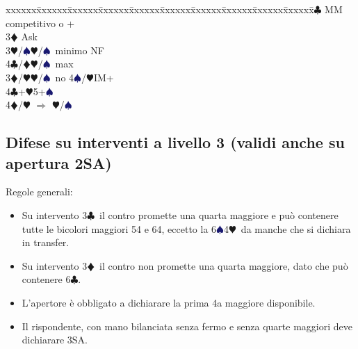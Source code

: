 \documentclass[a4paper,italian]{article}
\newcommand{\BC}{\textcolor{OliveGreen}{$\clubsuit$}}
\newcommand{\BD}{\textcolor{RedOrange}{$\vardiamondsuit$}}
\newcommand{\BH}{\textcolor{Red2}{$\varheartsuit${}}}
\newcommand{\BS}{\textcolor{MidnightBlue}{$\spadesuit${}}}
\newenvironment{bidtable}
{\begin{tabbing}

    xxxxxx\=xxxxxx\=xxxxxx\=xxxxxx\=xxxxxx\=xxxxxx\=xxxxxx\=xxxxxx\=xxxxxx\=xxxxxx\=\kill}
{\end{tabbing} }%
\begin{document}
\begin{multicols}{2}
\begin{bidtable}
                                            3\BC {} MM competitivo o +\+\\
                                            3\BD \> Ask\+\\
                                            3\BH/\BS {}\BH /\BS\ minimo NF\\
                                            4\BC/\BD {}\BH /\BS\ max\-\-\\
                                            3\BD/\BH {}\BH /\BS\ no 4\BS/\BH IM+\\
                                            4\BC {}+\BH 5+\BS \\
                                            4\BD/\BH \> $\Rightarrow$ \BH /\BS \-
                                        \end{bidtable}
                                        \subsection{Difese su interventi a livello 3 (validi anche su apertura 2SA)}

                                        Regole generali:
                                        \begin{itemize}
                                            \item Su intervento 3\BC\ il contro promette una quarta maggiore e può contenere tutte le bicolori maggiori 54 e 64, eccetto la 6\BS 4\BH\ da manche che si dichiara in transfer.
                                            \item Su intervento 3\BD\ il contro non promette una quarta maggiore, dato che può contenere 6\BC .
                                            \item L'apertore è obbligato a dichiarare la prima 4a maggiore disponibile.
                                            \item Il rispondente, con mano bilanciata senza fermo e senza quarte maggiori deve dichiarare 3SA.


\end{itemize}
\end{multicols}
\end{document}
